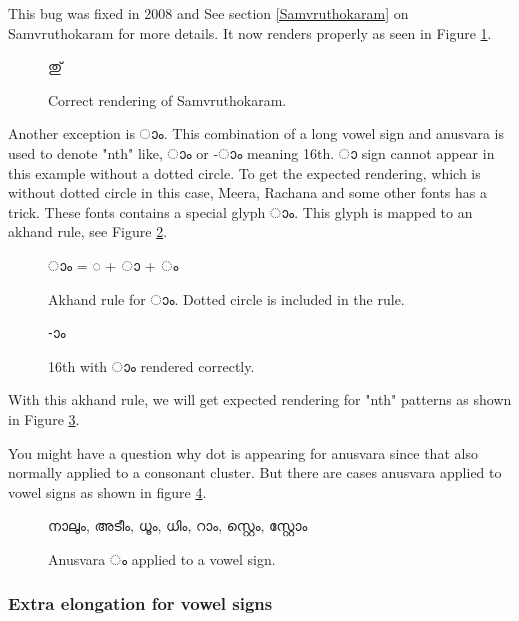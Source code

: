 This bug was fixed in 2008 and See section \ref{Samvruthokaram} on Samvruthokaram
for more details. It now renders properly as seen in Figure \ref{CorrectSamvruthokaram}.

\begin{figure}[h]
  \centering
  {\meera\textexample തു്}\\
  \caption{Correct rendering of Samvruthokaram.}
  \label{CorrectSamvruthokaram}
\end{figure}

Another exception is {\malayalam ാം}. This combination of a long vowel sign and
anusvara is used to denote "nth" like, {ാം} or  {-ാം}
meaning 16th. {\malayalam ാ} sign cannot appear in this example without a dotted
circle. To get the expected rendering, which is without dotted circle in this case,
Meera, Rachana and some other fonts has a trick. These fonts contains a special
glyph {\malayalam ാം}. This glyph is mapped to an akhand rule, see
Figure \ref{AkhandruleAAM}.

\begin{figure}[h]
  \centering
  {\meera\textexample  ാം = ◌ + ാ + ം}\\
  \caption{Akhand rule for {\malayalam ാം}. Dotted circle is included in the
rule.}
\label{AkhandruleAAM}
\end{figure}

\begin{figure}[h]
  \centering
  {\meera{}-ാം}\\
  \caption{16th with {\malayalam ാം} rendered correctly.}
  \label{CorrectAAMrendering}
\end{figure}

With this akhand rule, we will get expected rendering for "nth" patterns as
shown in Figure \ref{CorrectAAMrendering}.


You might have a question why dot is appearing for anusvara since that also
normally applied to a consonant cluster. But there are cases anusvara applied to
vowel signs as shown in figure \ref{Anusvararendering}.

\begin{figure}[h!]
  \centering
  {\meera\textexample നാലും, അടീം, ധൂം, ധിം, റാം, സ്റ്റെം, സ്റ്റോം}\\
  \caption{Anusvara {\malayalam ം} applied to a vowel sign.}
  \label{Anusvararendering}
\end{figure}

\subsubsection{Extra elongation for vowel signs}

